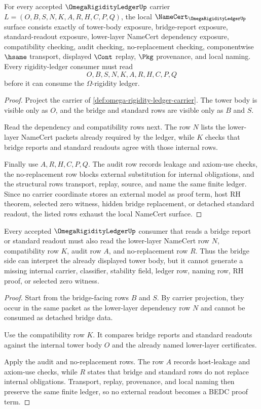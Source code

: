 \begin{theorem}
\label{thm:omega-rigidity-ledger-namecert-obligations}
For every accepted $\OmegaRigidityLedgerUp$ carrier $L=(O,B,S,N,K,A,R,H,C,P,Q)$, the local $\NameCert_{\OmegaRigidityLedgerUp}$ surface consists exactly of tower-body exposure, bridge-report exposure, standard-readout exposure, lower-layer NameCert dependency exposure, compatibility checking, audit checking, no-replacement checking, componentwise $\hsame$ transport, displayed $\Cont$ replay, $\Pkg$ provenance, and local naming. Every rigidity-ledger consumer must read
$$
O,B,S,N,K,A,R,H,C,P,Q
$$
before it can consume the $\Omega$-rigidity ledger.
\end{theorem}
\begin{proof}
Project the carrier of \autoref{def:omega-rigidity-ledger-carrier}. The tower body is visible only as $O$, and the bridge and standard rows are visible only as $B$ and $S$.

Read the dependency and compatibility rows next. The row $N$ lists the lower-layer NameCert packets already required by the ledger, while $K$ checks that bridge reports and standard readouts agree with those internal rows.

Finally use $A,R,H,C,P,Q$. The audit row records leakage and axiom-use checks, the no-replacement row blocks external substitution for internal obligations, and the structural rows transport, replay, source, and name the same finite ledger. Since no carrier coordinate stores an external model as proof term, host RH theorem, selected zero witness, hidden bridge replacement, or detached standard readout, the listed rows exhaust the local NameCert surface.
\end{proof}

\begin{theorem}
\label{thm:omega-rigidity-ledger-no-replacement-boundary}
Every accepted $\OmegaRigidityLedgerUp$ consumer that reads a bridge report or standard readout must also read the lower-layer NameCert row $N$, compatibility row $K$, audit row $A$, and no-replacement row $R$. Thus the bridge side can interpret the already displayed tower body, but it cannot generate a missing internal carrier, classifier, stability field, ledger row, naming row, RH proof, or selected zero witness.
\end{theorem}
\begin{proof}
Start from the bridge-facing rows $B$ and $S$. By carrier projection, they occur in the same packet as the lower-layer dependency row $N$ and cannot be consumed as detached bridge data.

Use the compatibility row $K$. It compares bridge reports and standard readouts against the internal tower body $O$ and the already named lower-layer certificates.

Apply the audit and no-replacement rows. The row $A$ records host-leakage and axiom-use checks, while $R$ states that bridge and standard rows do not replace internal obligations. Transport, replay, provenance, and local naming then preserve the same finite ledger, so no external readout becomes a BEDC proof term.
\end{proof}

